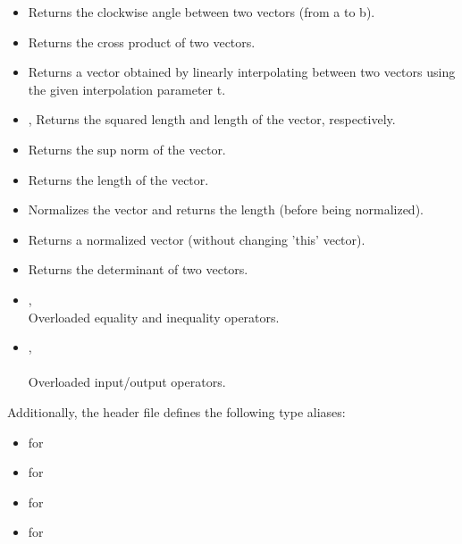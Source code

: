 \documentclass[a4paper,onecolumn,11pt]{doofus}
\begin{document}
\begin{itemize}
\item {} Returns the clockwise angle between two vectors (from a to b).

\item {} Returns the cross product of two vectors.

\item {} Returns a vector obtained by linearly interpolating between two vectors using the given interpolation parameter t.

\item {},  Returns the squared length and length of the vector, respectively.

\item {} Returns the sup norm of the vector.

\item {} Returns the length of the vector.

\item {} Normalizes the vector and returns the length (before being normalized).

\item {} Returns a normalized vector (without changing 'this' vector).

\item {} Returns the determinant of two vectors.

\item {},\\  Overloaded equality and inequality operators.

\item {},\\ 
\\ 
Overloaded input/output operators.
\end{itemize}

Additionally, the header file defines the following type aliases:

\begin{itemize}
\item {} for 
\item {}  for 
\item {}  for 
\item {}  for 
\end{itemize}
\end{document}
